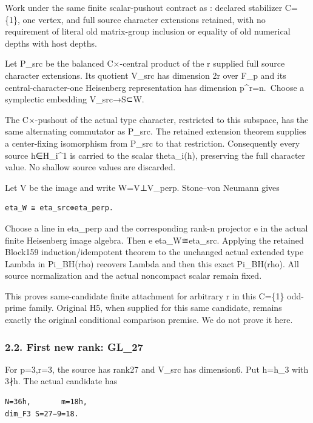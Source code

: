 Work under the same finite scalar-pushout contract as
: declared stabilizer C=\{1\}, one
vertex, and full source character extensions retained, with no
requirement of literal old matrix-group inclusion or equality of old
numerical depths with host depths.

Let P\_src be the balanced C×-central product of the r supplied full
source character extensions. Its quotient V\_src has dimension 2r over
F\_p and its central-character-one Heisenberg representation has
dimension p\^{}r=n.~Choose a symplectic embedding V\_src→S⊂W.

The C×-pushout of the actual type character, restricted to this
subspace, has the same alternating commutator as P\_src. The retained
extension theorem supplies a center-fixing isomorphism from P\_src to
that restriction. Consequently every source h∈H\_i\^{}1 is carried to
the scalar theta\_i(h), preserving the full character value. No shallow
source values are discarded.

Let V be the image and write W=V⊥V\_perp. Stone--von Neumann gives

\begin{Verbatim}[fontsize=\small,breaklines=true,breakanywhere=true]
eta_W ≅ eta_src⊗eta_perp.
\end{Verbatim}

Choose a line in eta\_perp and the corresponding rank-n projector e in
the actual finite Heisenberg image algebra. Then e eta\_W≅eta\_src.
Applying the retained Block159 induction/idempotent theorem to the
unchanged actual extended type Lambda in Pi\_BH(rho) recovers Lambda and
then this exact Pi\_BH(rho). All source normalization and the actual
noncompact scalar remain fixed.

This proves same-candidate finite attachment for arbitrary r in this
C=\{1\} odd-prime family. Original H5, when supplied for this same
candidate, remains exactly the original conditional comparison premise.
We do not prove it here.

\hypertarget{odd_capacity-first-new-rank-gl_27}{%
\subsubsection{2.2. First new rank: GL\_27}\label{odd_capacity-first-new-rank-gl_27}}

For p=3,r=3, the source has rank27 and V\_src has dimension6. Put h=h\_3
with 3∤h. The actual candidate has

\begin{Verbatim}[fontsize=\small,breaklines=true,breakanywhere=true]
N=36h,       m=18h,
dim_F3 S=27−9=18.
\end{Verbatim}

